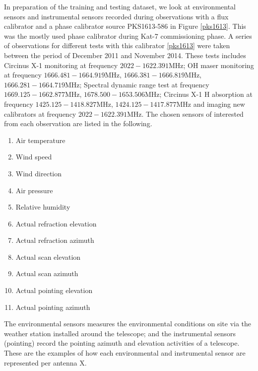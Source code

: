 In preparation of the training and testing dataset, we look at environmental sensors and instrumental sensors
recorded during observations with a flux calibrator and a phase calibrator source
PKS1613-586 in Figure \ref{pks1613}. This was the mostly used phase calibrator during Kat-7 commissioning phase. A series of observations for different tests with this calibrator \ref{pks1613} were taken between the period of December 2011 and November 2014. These tests includes Circinus X-1 monitoring at frequency $2022 - 1622.391 \text{MHz}$; OH maser monitoring at frequency $1666.481 - 1664.919 \text{MHz}$, $1666.381-1666.819\text{MHz}$,  $1666.281- 1664.719\text{MHz}$; Spectral dynamic range test at frequency $1669.125 - 1662.877 \text{MHz}$, $1678.500 - 1653.506 \text{MHz}$; Circinus X-1 H absorption at frequency $1425.125 - 1418.827 \text{MHz}$, $1424.125 - 1417.877 \text{MHz}$ and imaging new calibrators at frequency $2022 - 1622.391 \text{MHz}$. The chosen sensors of interested from each observation are listed in the following. 
\begin{enumerate}

\item Air temperature
\item Wind speed
\item Wind direction 
\item Air pressure 
\item Relative humidity 
\item Actual refraction elevation
\item Actual refraction azimuth
\item Actual scan elevation
\item Actual scan azimuth 
\item Actual pointing elevation
\item Actual pointing azimuth 
\end{enumerate}
The environmental sensors measures the environmental conditions on site via the weather station installed around the telescope; and the instrumental sensors (pointing) record the pointing azimuth and elevation activities of a telescope. These are the examples of how each environmental and instrumental sensor are represented per antenna X.

 
